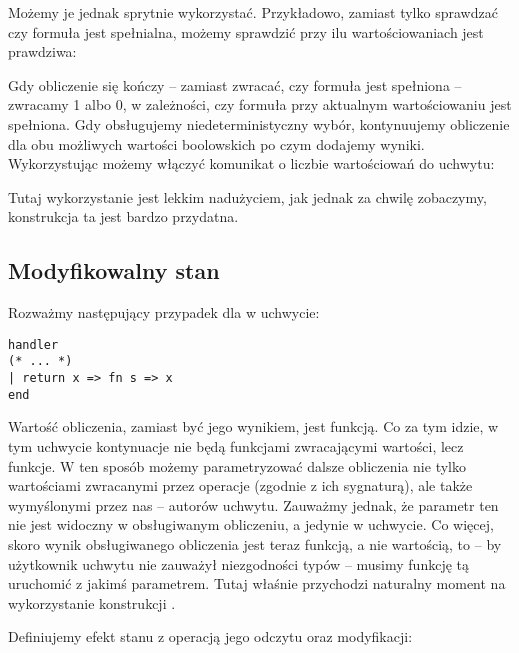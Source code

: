 
Możemy je jednak sprytnie wykorzystać. Przykładowo, zamiast tylko sprawdzać czy formuła jest spełnialna, możemy sprawdzić przy ilu wartościowaniach jest prawdziwa:



Gdy obliczenie się kończy -- zamiast zwracać, czy formuła jest spełniona -- zwracamy 1 albo 0, w zależności, czy formuła przy aktualnym wartościowaniu jest spełniona. Gdy obsługujemy niedeterministyczny wybór, kontynuujemy obliczenie dla obu możliwych wartości boolowskich po czym dodajemy wyniki. Wykorzystując  możemy włączyć komunikat o liczbie wartościowań do uchwytu:



Tutaj wykorzystanie  jest lekkim nadużyciem, jak jednak za chwilę zobaczymy, konstrukcja ta jest bardzo przydatna.

\subsection{Modyfikowalny stan}

Rozważmy następujący przypadek dla  w uchwycie:

\begin{lstlisting}
handler
(* ... *)
| return x => fn s => x
end
\end{lstlisting}

Wartość obliczenia, zamiast być jego wynikiem, jest funkcją. Co za tym idzie, w tym uchwycie kontynuacje nie będą funkcjami zwracającymi wartości, lecz funkcje. W ten sposób możemy parametryzować dalsze obliczenia nie tylko wartościami zwracanymi przez operacje (zgodnie z ich sygnaturą), ale także wymyślonymi przez nas -- autorów uchwytu. Zauważmy jednak, że parametr ten nie jest widoczny w obsługiwanym obliczeniu, a jedynie w uchwycie. Co więcej, skoro wynik obsługiwanego obliczenia jest teraz funkcją, a nie wartością, to -- by użytkownik uchwytu nie zauważył niezgodności typów -- musimy funkcję tą uruchomić z jakimś parametrem. Tutaj właśnie przychodzi naturalny moment na wykorzystanie konstrukcji .

Definiujemy efekt stanu z operacją jego odczytu oraz modyfikacji:

